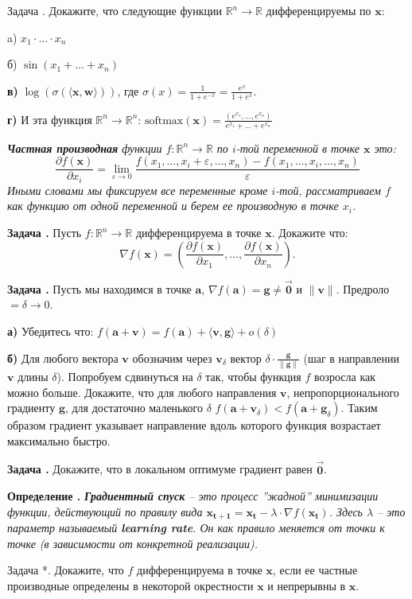 \documentclass[12pt,a4paper]{article}
\def\R{\mathbb{R}}
\newcounter{znum}
\newcommand{\zz}[1]{\addtocounter{znum}{1} \textbf{Задача \arabic{znum}#1. }}
\newcommand{\z}[1]{\addtocounter{znum}{1} Задача \arabic{znum}#1. }
\newcounter{defnum}
\newcommand{\df}[1]{\addtocounter{defnum}{1} \textbf{Определение \arabic{defnum}.} {\it #1}}
\begin{document}
\z{} Докажите, что следующие функции $\R^n \to \R$ дифференцируемы по $\mathbf{x}$: \par
a) $x_1 \cdot \ldots \cdot x_n$ \par
б) $\sin(x_1 + \ldots + x_n)$ \par
\textbf{в)} $\log(\sigma(\langle \mathbf{x}, \mathbf{w} \rangle))$, где $\sigma(x) = \frac{1}{1 + e^{-x}} = \frac{e^{x}}{1 + e^{x}}.$\par
\textbf{г)} И эта функция $\R^n \to \R^n$: $\mathrm{softmax}(\mathbf{x}) = \frac{(e^{x_1}, \ldots, e^{x_n})}{e^{x_1} + \ldots + e^{x_n}}$\par

{\it \textbf{Частная производная} функции $f : \R^n \to \R$ по $i$-той переменной в точке $\mathbf{x}$ это:
$$ \frac{\partial f(\mathbf{x})}{\partial x_i} = \lim_{\varepsilon \to 0} \frac{f(x_1, \ldots, x_i + \varepsilon,\ldots, x_n) - f(x_1, \ldots, x_i,\ldots, x_n)}{\varepsilon} $$
Иными словами мы фиксируем все переменные кроме $i$-той, рассматриваем $f$ как функцию от одной переменной и берем ее производную в точке $x_i$.
}

\zz{} Пусть $f : \R^n \to \R$ дифференцируема в точке $\mathbf{x}$. Докажите что:
$$ \nabla f(\mathbf{x}) = \left(\frac{\partial f(\mathbf{x})}{\partial x_1}, \ldots, \frac{\partial f(\mathbf{x})}{\partial x_n}\right) .$$

\zz{} Пусть мы находимся в точке $\mathbf{a}$, $\nabla f(\mathbf{a}) = \mathbf{g} \ne \overrightarrow{\mathbf{0}}$
 и $\| \mathbf{v} \|$. Предроло $ = \delta \to 0$.

\textbf{а)} Убедитесь что: $ f(\mathbf{a} + \mathbf{v}) = f(\mathbf{a}) + \langle \mathbf{v}, \mathbf{g} \rangle + o(\delta)$\par
\textbf{б)} Для любого вектора $\mathbf{v}$ обозначим через $\mathbf{v}_\delta$ вектор $\delta \cdot \frac{\mathbf{g}}{\|\mathbf{g}\|}$ (шаг в направлении $\mathbf{v}$ длины $\delta$). Попробуем сдвинуться на $\delta$ так, чтобы функция $f$ возросла как можно больше. Докажите, что для любого направления $\mathbf{v}$, непропорционального градиенту $\mathbf{g}$,  для достаточно маленького $\delta$ $f(\mathbf{a} + \mathbf{v}_\delta) < f(\mathbf{a} + \mathbf{g}_\delta)$. Таким образом градиент указывает направление вдоль которого функция возрастает максимально быстро.

\zz{} Докажите, что в локальном оптимуме градиент равен $\overrightarrow{\mathbf{0}}$.

\df{\textbf{Градиентный спуск} -- это процесс ''жадной'' минимизации функции, действующий по правилу вида $\mathbf{x_{t + 1}} = \mathbf{x_{t}} - \lambda \cdot \nabla f(\mathbf{x_{t}})$. Здесь $\lambda$ -- это параметр называемый \textbf{learning rate}. Он как правило меняется от точки к точке (в зависимости от конкретной реализации).}

\z{*} Докажите, что $f$ дифференцируема в точке $\mathbf{x}$, если ее частные производные определены в некоторой окрестности $\mathbf{x}$ и непрерывны в $\mathbf{x}$.
\end{document}
